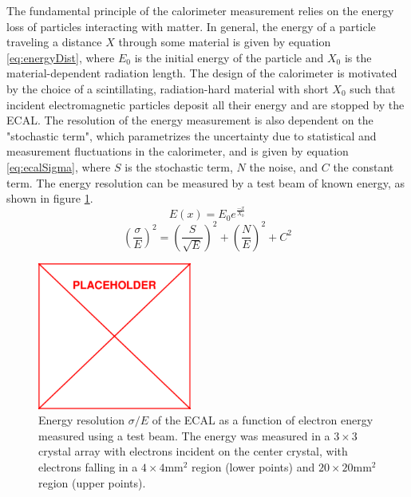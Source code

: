 The fundamental principle of the calorimeter measurement relies on the energy loss of particles interacting with matter. In general, the energy of a particle traveling a distance $X$ through some material is given by equation \ref{eq:energyDist}, where $E_0$ is the initial energy of the particle and $X_0$ is the material-dependent radiation length. The design of the calorimeter is motivated by the choice of a scintillating, radiation-hard material with short $X_0$ such that incident electromagnetic particles deposit all their energy and are stopped by the ECAL. The resolution of the energy measurement is also dependent on the "stochastic term", which parametrizes the uncertainty due to statistical and measurement fluctuations in the calorimeter, and is given by equation \ref{eq:ecalSigma}, where $S$ is the stochastic term, $N$ the noise, and $C$ the constant term. The energy resolution can be measured by a test beam of known energy, as shown in figure \ref{fig:ecalSigma}.
\begin{equation}
	\label{eq:energyDist}
	E(x)=E_0 e^{\frac{-x}{X_0}}
\end{equation}
\begin{equation}
	\label{eq:ecalSigma}
	\left(\frac{\sigma}{E}\right)^2=\left(\frac{S}{\sqrt{E}}\right)^2+\left(\frac{N}{E}\right)^2+C^2
\end{equation}
\begin{figure}
	\centering
	\includegraphics[width=0.45\textwidth]{figs/placeholder}
	\caption{Energy resolution $\sigma/E$ of the ECAL as a function of electron energy measured using a test beam. The energy was measured in a $3\times3$ crystal array with electrons incident on the center crystal, with electrons falling in a $4\times4\text{mm}^2$ region (lower points) and $20\times20\text{mm}^2$ region (upper points).}
	\label{fig:ecalSigma}
\end{figure}

